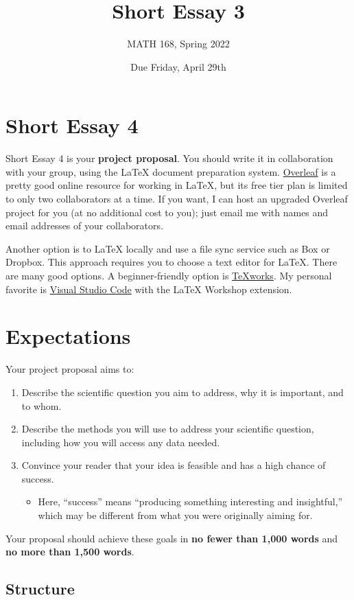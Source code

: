 \documentclass{hw}
\title{Short Essay 3}
\author{MATH 168, Spring 2022}
\date{Due Friday, April 29th}
\begin{document}
\section*{Short Essay 4}

Short Essay 4 is your \textbf{project proposal}. 
You should write it in collaboration with your group, using the \LaTeX{} document preparation system. 
\href{https://www.overleaf.com}{Overleaf} is a pretty good online resource for working in \LaTeX, but its free tier plan is limited to only two collaborators at a time. 
If you want, I can host an upgraded Overleaf project for you (at no additional cost to you); just email me with names and email addresses of your collaborators.  

Another option is to \LaTeX{} locally and use a file sync service such as Box or Dropbox. 
This approach requires you to choose a text editor for \LaTeX{}. 
There are many good options. 
A beginner-friendly option is \href{https://www.tug.org/texworks/}{TeXworks}. 
My personal favorite is \href{https://code.visualstudio.com}{Visual Studio Code} with the LaTeX Workshop extension. 

\section*{Expectations}

Your project proposal aims to: 
\begin{enumerate}
    \item Describe the scientific question you aim to address, why it is important, and to whom. 
    \item Describe the methods you will use to address your scientific question, including how you will access any data needed.
    \item Convince your reader that your idea is feasible and has a high chance of success. 
    \begin{itemize}
        \item Here, ``success'' means ``producing something interesting and insightful,'' which may be different from what you were originally aiming for. 
    \end{itemize} 
\end{enumerate}
Your proposal should achieve these goals in \textbf{no fewer than 1,000 words} and \textbf{no more than 1,500 words}. 

\subsection*{Structure}
\end{document}
